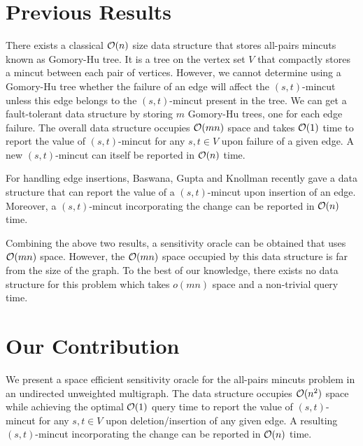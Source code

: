 



\section{Previous Results} 


There exists a classical ${\cal O}(n)$ size data structure that stores all-pairs mincuts \cite{GH61} known as Gomory-Hu tree. It is a tree on the vertex set $V$ that compactly stores a mincut between each pair of vertices. However, we cannot determine using a Gomory-Hu tree whether the failure of an edge will affect the $(s,t)$-mincut unless this edge belongs to the $(s,t)$-mincut present in the tree. We can get a fault-tolerant data structure by storing $m$ Gomory-Hu trees, one for each edge failure. The overall data structure occupies ${\cal O}(mn)$ space and takes ${\cal O}(1)$ time to report the value of $(s,t)$-mincut for any $s,t\in V$ upon failure of a given edge. A new $(s,t)$-mincut can itself be reported in ${\cal O}(n)$ time. 


For handling edge insertions, Baswana, Gupta and Knollman \cite{DBLP:conf/esa/BaswanaGK20} recently gave a data structure that can report the value of a $(s,t)$-mincut upon insertion of an edge. Moreover, a $(s,t)$-mincut incorporating the change can be reported in ${\cal O}(n)$ time.


Combining the above two results, a sensitivity oracle can be obtained that uses ${\cal O}(mn)$ space. However, the ${\cal O}(mn)$ space occupied by this data structure is far from the size of the graph. To the best of our knowledge, there exists no data structure for this problem which takes $o(mn)$ space and a non-trivial query time.



\section{Our Contribution} We present a space efficient sensitivity oracle for the all-pairs mincuts problem in an undirected unweighted multigraph. The data structure occupies ${\cal O}(n^2)$ space while achieving the optimal ${\cal O}(1)$ query time to report the value of $(s,t)$-mincut for any $s,t\in V$ upon deletion/insertion of any given edge. A resulting $(s,t)$-mincut incorporating the change can be reported in ${\cal O}(n)$ time.

